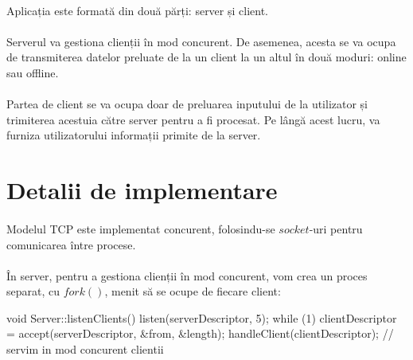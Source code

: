 \documentclass[runningheads]{llncs}
\begin{document}
\paragraph{}
Aplicația este formată din două părți: server și client. 
\vspace{-4mm}
\paragraph{}
Serverul va gestiona clienții în mod concurent. De asemenea, acesta se va ocupa de
transmiterea datelor preluate de la un client la un altul în două moduri: online sau offline. 
\vspace{-4mm}
\paragraph{}
Partea de client se va ocupa doar de preluarea inputului de la utilizator și trimiterea acestuia către server pentru a fi procesat.
Pe lângă acest lucru, va furniza utilizatorului informații primite de la server.

\section{Detalii de implementare}
\paragraph{}
Modelul TCP este implementat concurent, folosindu-se $socket$-uri pentru comunicarea între procese.
\vspace{-4mm}
\paragraph{}
În server, pentru a gestiona clienții în mod concurent, vom crea un proces separat, cu $fork()$, menit să se ocupe de fiecare client:

\begin{queryl}[linewidth=16.2cm, frame=single]
    void Server::listenClients() {
        listen(serverDescriptor, 5);
        while (1) {
          clientDescriptor = accept(serverDescriptor, &from, &length);
          handleClient(clientDescriptor); // servim in mod concurent clientii
        }
    }
\end{queryl}
\end{document}
